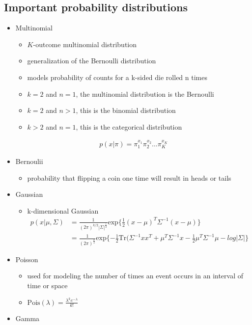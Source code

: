 \documentclass[../main.tex]{subfiles}
\begin{document}
\subsection{Important probability distributions}
  \begin{itemize}
    \item Multinomial
    \begin{itemize}
      \item $K$-outcome multinomial distribution
      \item generalization of the Bernoulli distribution
      \item models probability of counts for a k-sided die rolled n times
      \item $k = 2$ and $n = 1$, the multinomial distribution is the Bernoulli
      \item $k = 2$ and $n > 1$, this is the binomial distribution
      \item $k > 2$ and $n = 1$, this is the categorical distribution
    \end{itemize}
    \begin{align*}
      p(x|\pi) = \pi_{1}^{x_{1}}\pi_{2}^{x_{2}} \dotsc \pi_{K}^{x_{K}}
    \end{align*}
    \item Bernoulii
    \begin{itemize}
      \item probability that flipping a coin one time will result in heads or tails
    \end{itemize}
    \item Gaussian
    \begin{itemize}
      \item k-dimensional Gaussian
      \begin{align*}
        p(x|\mu, \Sigma) &= \frac{1}{(2\pi)^{k/2}|\Sigma|^{\frac{1}{2}}}\text{exp}\{\frac{1}{2}(x-\mu)^{T}\Sigma^{-1}(x-\mu)\} \\
        &= \frac{1}{(2\pi)^{\frac{k}{2}}}\text{exp}\{-\frac{1}{2}\text{Tr}(\Sigma^{-1}xx^{T} + \mu^{T}\Sigma^{-1}x - \frac{1}{2}\mu^{T}\Sigma^{-1}\mu - log|\Sigma|\}
      \end{align*}
    \end{itemize}
    \item Poisson
    \begin{itemize}
      \item used for modeling the number of times an event occurs in an interval of time or space
      \item $\text{Pois}(\lambda) = \frac{\lambda^{k}e^{-\lambda}}{k!}$
    \end{itemize}
    \item Gamma
  \end{itemize}
\end{document}
